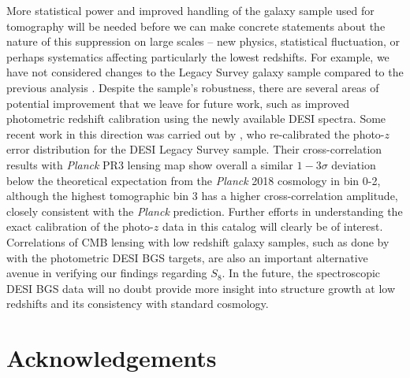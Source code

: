 \documentclass[twocolumn]{aastex631}
\newcommand{\Ellen}[1]{\textcolor{orange}{(QH: #1)}}
\begin{document}
{More statistical power and improved handling of the galaxy sample used for tomography will be needed before we can make concrete statements about the nature of this suppression on large scales -- new physics, statistical fluctuation, or perhaps systematics affecting particularly the lowest redshifts. For example, we have not considered changes to the Legacy Survey  galaxy sample compared to the previous analysis \citep{hang2021}. Despite the sample's robustness, there are several areas of potential improvement that we leave for future work, such as improved photometric redshift calibration using the newly available DESI spectra.
Some recent work in this direction was carried out by \cite{saraf2024effect}, who re-calibrated the photo-$z$ error distribution for the DESI Legacy Survey sample.
Their cross-correlation results with \textit{Planck} PR3 lensing map show overall a similar $1-3\sigma$ deviation below the theoretical expectation from the \textit{Planck} 2018 cosmology in bin 0-2, although the highest tomographic bin 3 has a
higher cross-correlation amplitude, closely consistent with the {\it Planck\/} prediction. 
Further efforts in understanding the exact calibration of the photo-$z$ data in this catalog will clearly be of interest.
Correlations of CMB lensing with low redshift galaxy samples, such as done by \cite{2024arXiv240704795C} with the photometric DESI BGS targets, are also an important alternative avenue in verifying our findings regarding $S_8$. In the future, the spectroscopic DESI BGS data will no doubt provide more insight into structure growth at low redshifts and its consistency with standard cosmology.


\section*{Acknowledgements}





%

}
\end{document}
